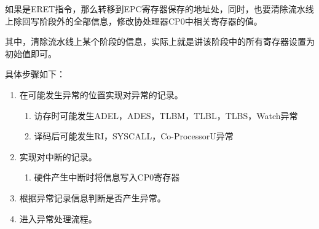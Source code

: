 如果是ERET指令，那么转移到EPC寄存器保存的地址处，同时，也要清除流水线上除回写阶段外的全部信息，修改协处理器CP0中相关寄存器的值。

其中，清除流水线上某个阶段的信息，实际上就是讲该阶段中的所有寄存器设置为初始值即可。

具体步骤如下：

\begin{enumerate}
	\item 在可能发生异常的位置实现对异常的记录。
	
	\begin{enumerate}[(1)]
		\item 访存时可能发生ADEL，ADES，TLBM，TLBL，TLBS，Watch异常
		
		\item 译码后可能发生RI，SYSCALL，Co-ProcessorU异常
	\end{enumerate}
	\item 实现对中断的记录。
	
	\begin{enumerate}[(1)]
		\item 硬件产生中断时将信息写入CP0寄存器
	\end{enumerate}
	
	\item 根据异常记录信息判断是否产生异常。
	
	\item 进入异常处理流程。
	
\end{enumerate}
